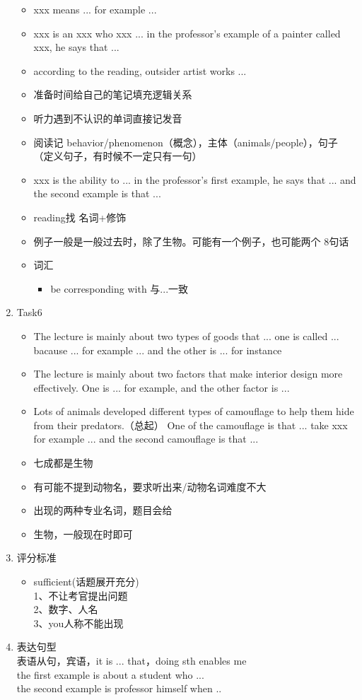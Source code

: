\documentclass[UTF8]{ctexart}
\begin{document}
\begin{enumerate}
\begin{itemize}
  \item xxx means ... for example ...
  \item xxx is an xxx who xxx ... in the professor's example of a painter called xxx, he says that ...
  \item according to the reading, outsider artist works ...
  \item 准备时间给自己的笔记填充逻辑关系
  \item 听力遇到不认识的单词直接记发音
  \item 阅读记 behavior/phenomenon（概念），主体（animals/people），句子（定义句子，有时候不一定只有一句）
  \item xxx is the ability to ... in the professor's first example, he says that ... and the second example is that ...
  \item reading找 名词+修饰
  \item 例子一般是一般过去时，除了生物。可能有一个例子，也可能两个 8句话
  \item 词汇
  \begin{itemize}
    \item be corresponding with 与...一致
  \end{itemize}
\end{itemize}
\item Task6
\begin{itemize}
  \item The lecture is mainly about two types of goods that ... one is called ... bacause ... for example ... and the other is ... for instance
  \item The lecture is mainly about two factors that make interior design more effectively. One is ... for example, and the other factor is ...
  \item Lots of animals developed different types of camouflage to help them hide from their predators.（总起） One of the camouflage is that ... take xxx for example ... and the second camouflage is that ...
  \item 七成都是生物
  \item 有可能不提到动物名，要求听出来/动物名词难度不大
  \item 出现的两种专业名词，题目会给
  \item 生物，一般现在时即可
\end{itemize}
\item 评分标准
\begin{itemize}
  \item sufficient(话题展开充分)\\
  1、不让考官提出问题\\
  2、数字、人名\\
  3、you人称不能出现\\
  \end{itemize}
\item 表达句型\\
表语从句，宾语，it is ... that，doing sth enables me\\
the first example is about a student who ...\\
  the second example is professor himself when ..\\
\end{enumerate}
\end{document}
